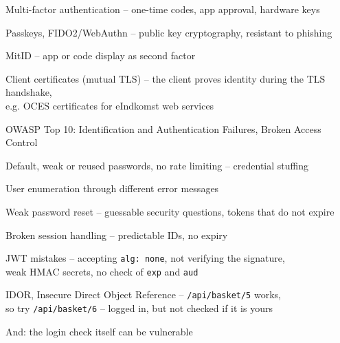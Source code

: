 \documentclass[Screen16to9,17pt]{foils}
\begin{document}

\begin{list2}
\item Multi-factor authentication -- one-time codes, app approval, hardware keys
\item Passkeys, FIDO2/WebAuthn -- public key cryptography, resistant to phishing
\item MitID -- app or code display as second factor
\item Client certificates (mutual TLS) -- the client proves identity during the TLS handshake,\\
  e.g. OCES certificates for eIndkomst web services
\end{list2}


\begin{list2}
\item OWASP Top 10: Identification and Authentication Failures, Broken Access Control
\item Default, weak or reused passwords, no rate limiting -- credential stuffing
\item User enumeration through different error messages
\item Weak password reset -- guessable security questions, tokens that do not expire
\item Broken session handling -- predictable IDs, no expiry
\item JWT mistakes -- accepting \verb+alg: none+, not verifying the signature,\\
  weak HMAC secrets, no check of \verb+exp+ and \verb+aud+
\item IDOR, Insecure Direct Object Reference -- \verb+/api/basket/5+ works,\\
  so try \verb+/api/basket/6+ -- logged in, but not checked if it is yours
\item And: the login check itself can be vulnerable
\end{list2}

\end{document}
